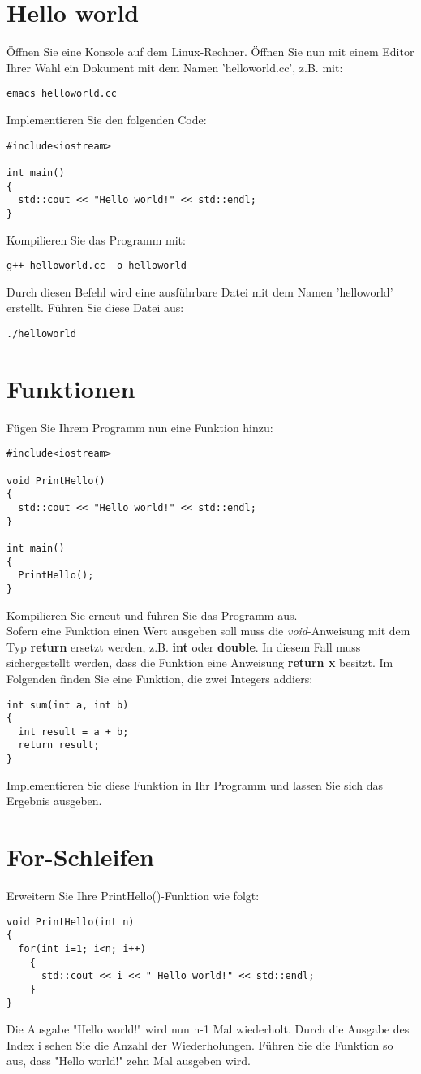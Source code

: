 \documentclass[12pt,twoside,a4paper]{article}
\begin{document}
\section{Hello world}
\"Offnen Sie eine Konsole auf dem Linux-Rechner. \"Offnen Sie nun mit einem Editor Ihrer Wahl ein Dokument mit dem Namen 'helloworld.cc', z.B. mit:
 \begin{lstlisting}
emacs helloworld.cc
 \end{lstlisting}
Implementieren Sie den folgenden Code:
\begin{lstlisting}
#include<iostream>

int main()
{
  std::cout << "Hello world!" << std::endl;
}
\end{lstlisting}
Kompilieren Sie das Programm mit:
\begin{lstlisting}
g++ helloworld.cc -o helloworld
\end{lstlisting}
Durch diesen Befehl wird eine ausf\"uhrbare Datei mit dem Namen 'helloworld' erstellt. F\"uhren Sie diese Datei aus:
\begin{lstlisting}
./helloworld
\end{lstlisting}

\section{Funktionen}
F\"ugen Sie Ihrem Programm nun eine Funktion hinzu:
\begin{lstlisting}
#include<iostream>

void PrintHello()
{
  std::cout << "Hello world!" << std::endl;
}

int main()
{
  PrintHello();
}
\end{lstlisting}
Kompilieren Sie erneut und f\"uhren Sie das Programm aus.\\
Sofern eine Funktion einen Wert ausgeben soll muss die \textit{void}-Anweisung mit dem Typ \textbf{return} ersetzt werden, z.B. \textbf{int} oder \textbf{double}. In diesem Fall muss sichergestellt werden, dass die Funktion eine Anweisung \textbf{return x} besitzt. Im Folgenden finden Sie eine Funktion, die zwei Integers addiers:
\begin{lstlisting}
int sum(int a, int b)
{
  int result = a + b;
  return result;
}
\end{lstlisting}
Implementieren Sie diese Funktion in Ihr Programm und lassen Sie sich das Ergebnis ausgeben.

\section{For-Schleifen}
Erweitern Sie Ihre PrintHello()-Funktion wie folgt:
\begin{lstlisting}
void PrintHello(int n)
{
  for(int i=1; i<n; i++)
    {
      std::cout << i << " Hello world!" << std::endl;
    }
}
\end{lstlisting}
Die Ausgabe "Hello world!" wird nun n-1 Mal wiederholt. Durch die Ausgabe des Index i sehen Sie die Anzahl der Wiederholungen. F\"uhren Sie die Funktion so aus, dass "Hello world!" zehn Mal ausgeben wird.
\end{document}

